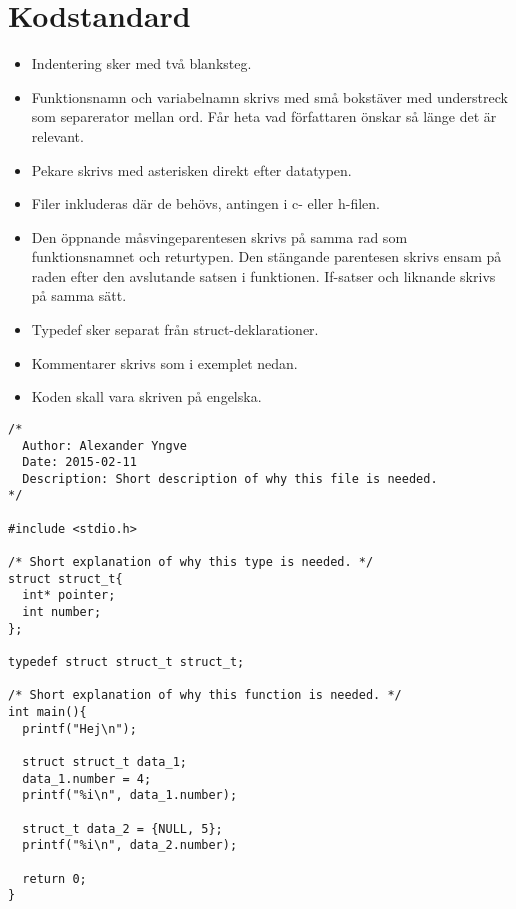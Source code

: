 
\section{Kodstandard}

\begin{itemize}
  \item Indentering sker med två blanksteg.
  \item Funktionsnamn och variabelnamn skrivs med små bokstäver med understreck som separerator mellan ord. Får heta vad författaren önskar så länge det är relevant. 
  \item Pekare skrivs med asterisken direkt efter datatypen.
  \item Filer inkluderas där de behövs, antingen i c- eller h-filen.
  \item Den öppnande måsvingeparentesen skrivs på samma rad som funktionsnamnet och returtypen. Den stängande parentesen skrivs ensam på raden efter den avslutande satsen i funktionen. If-satser och liknande skrivs på samma sätt.
  \item Typedef sker separat från struct-deklarationer.
  \item Kommentarer skrivs som i exemplet nedan.
  \item Koden skall vara skriven på engelska.
\end{itemize}

\begin{lstlisting}
/*
  Author: Alexander Yngve
  Date: 2015-02-11
  Description: Short description of why this file is needed.
*/

#include <stdio.h>

/* Short explanation of why this type is needed. */
struct struct_t{
  int* pointer;
  int number;
};

typedef struct struct_t struct_t;

/* Short explanation of why this function is needed. */
int main(){
  printf("Hej\n");

  struct struct_t data_1;
  data_1.number = 4;
  printf("%i\n", data_1.number);

  struct_t data_2 = {NULL, 5};
  printf("%i\n", data_2.number);

  return 0;
}
\end{lstlisting}
